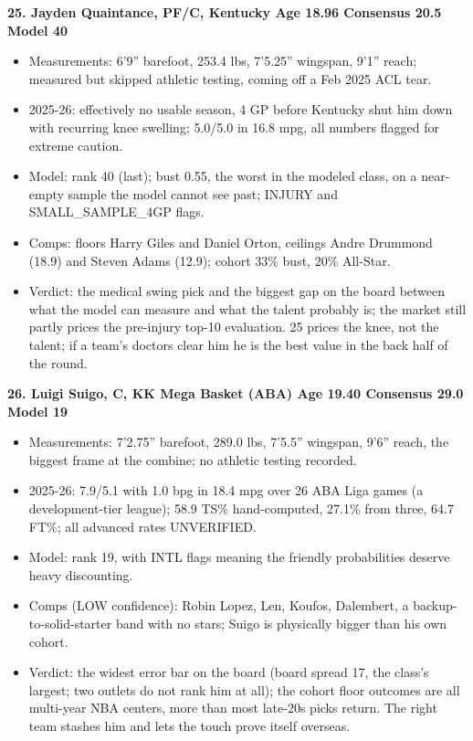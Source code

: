 \documentclass[
  10pt,
]{article}
\providecommand{\tightlist}{%
  \setlength{\itemsep}{0pt}\setlength{\parskip}{0pt}}
\begin{document}
\textbf{25. Jayden Quaintance, PF/C, Kentucky \textbar{} Age 18.96 \textbar{}
Consensus 20.5 \textbar{} Model 40}

\begin{itemize}
\tightlist
\item
  Measurements: 6'9'' barefoot, 253.4 lbs, 7'5.25'' wingspan, 9'1'' reach;
  measured but skipped athletic testing, coming off a Feb 2025 ACL tear.
\item
  2025-26: effectively no usable season, 4 GP before Kentucky shut him down with
  recurring knee swelling; 5.0/5.0 in 16.8 mpg, all numbers flagged for extreme
  caution.
\item
  Model: rank 40 (last); bust 0.55, the worst in the modeled class, on a
  near-empty sample the model cannot see past; INJURY and SMALL\_SAMPLE\_4GP
  flags.
\item
  Comps: floors Harry Giles and Daniel Orton, ceilings Andre Drummond (18.9) and
  Steven Adams (12.9); cohort 33\% bust, 20\% All-Star.
\item
  Verdict: the medical swing pick and the biggest gap on the board between what
  the model can measure and what the talent probably is; the market still partly
  prices the pre-injury top-10 evaluation. 25 prices the knee, not the talent;
  if a team's doctors clear him he is the best value in the back half of the
  round.
\end{itemize}

\textbf{26. Luigi Suigo, C, KK Mega Basket (ABA) \textbar{} Age 19.40 \textbar{}
Consensus 29.0 \textbar{} Model 19}

\begin{itemize}
\tightlist
\item
  Measurements: 7'2.75'' barefoot, 289.0 lbs, 7'5.5'' wingspan, 9'6'' reach, the
  biggest frame at the combine; no athletic testing recorded.
\item
  2025-26: 7.9/5.1 with 1.0 bpg in 18.4 mpg over 26 ABA Liga games (a
  development-tier league); 58.9 TS\% hand-computed, 27.1\% from three, 64.7
  FT\%; all advanced rates UNVERIFIED.
\item
  Model: rank 19, with INTL flags meaning the friendly probabilities deserve
  heavy discounting.
\item
  Comps (LOW confidence): Robin Lopez, Len, Koufos, Dalembert, a
  backup-to-solid-starter band with no stars; Suigo is physically bigger than
  his own cohort.
\item
  Verdict: the widest error bar on the board (board spread 17, the class's
  largest; two outlets do not rank him at all); the cohort floor outcomes are
  all multi-year NBA centers, more than most late-20s picks return. The right
  team stashes him and lets the touch prove itself overseas.
\end{itemize}
\end{document}
